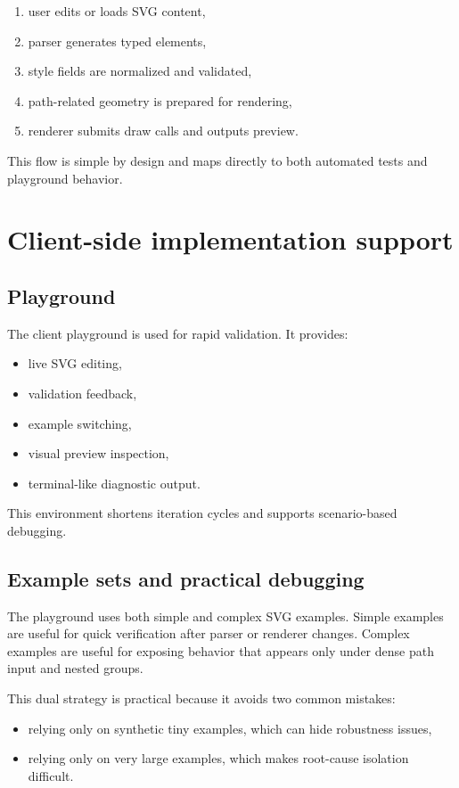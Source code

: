 \begin{enumerate}
\item user edits or loads SVG content,
\item parser generates typed elements,
\item style fields are normalized and validated,
\item path-related geometry is prepared for rendering,
\item renderer submits draw calls and outputs preview.
\end{enumerate}

This flow is simple by design and maps directly to both automated tests and playground behavior.

\section{Client-side implementation support}

\subsection{Playground}

The client playground is used for rapid validation.
It provides:

\begin{itemize}
\item live SVG editing,
\item validation feedback,
\item example switching,
\item visual preview inspection,
\item terminal-like diagnostic output.
\end{itemize}

This environment shortens iteration cycles and supports scenario-based debugging.

\subsection{Example sets and practical debugging}

The playground uses both simple and complex SVG examples.
Simple examples are useful for quick verification after parser or renderer changes.
Complex examples are useful for exposing behavior that appears only under dense path input and nested groups.

This dual strategy is practical because it avoids two common mistakes:

\begin{itemize}
\item relying only on synthetic tiny examples, which can hide robustness issues,
\item relying only on very large examples, which makes root-cause isolation difficult.
\end{itemize}


